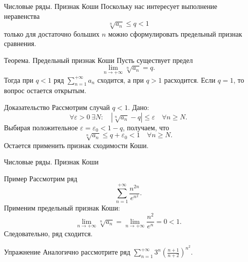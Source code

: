 \documentclass[8pt]{beamer}
\begin{document}

\begin{frame}{Числовые ряды. Признак Коши}
Поскольку нас интересует выполнение неравенства
$$\sqrt[n]{a_n}\le q<1$$
только для достаточно больших $n$ можно сформулировать предельный признак сравнения.
\begin{block}{Теорема. Предельный признак Коши}
Пусть существует предел
$$\lim_{n\to+\infty}\sqrt[n]{a_n} = q.$$
Тогда при $q<1$ ряд $\displaystyle \sum_{n=1}^{+\infty}a_n$ сходится, а при $q>1$ расходится. Если $q=1$, то вопрос остается открытым.
\end{block}
\begin{block}{Доказательство}
Рассмотрим случай $q<1$. Дано:
$$\forall \varepsilon>0 \ \exists N:\quad |\sqrt[n]{a_n}-q|\le\varepsilon\quad \forall n\ge N.$$
Выбирая положительное $\varepsilon=\varepsilon_0 < 1-q$, получаем, что
$$\sqrt[n]{a_n}\le q+\varepsilon_0<1\quad \forall n\ge N.$$
Остается применить признак сходимости Коши.
\end{block}
\end{frame}

\begin{frame}{Числовые ряды. Признак Коши}
\begin{block}{Пример}
Рассмотрим ряд
$$\sum_{n=1}^{+\infty}\frac{n^{2n}}{e^{n^2}}.$$
Применим предельный признак Коши:
$$\lim_{n\to+\infty}\sqrt[n]{a_n} = \lim_{n\to+\infty}\frac{n^2}{e^{n}} = 0<1.$$
Следовательно, ряд сходится.
\end{block}
\begin{block}{Упражнение}
Аналогично рассмотрите ряд 
$\displaystyle \sum_{n=1}^{+\infty} 3^n \left(\frac{n+1}{n+2}\right)^{n^2}$.
\end{block}
\end{frame}
\end{document}
